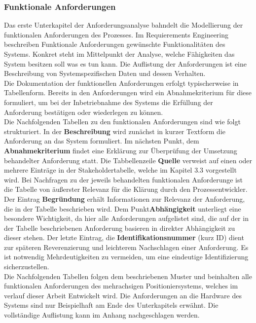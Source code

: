 \documentclass[../Bachelorarbeit.tex]{subfiles}
\begin{document}
\subsubsection{Funktionale Anforderungen}
Das erste Unterkapitel der Anforderungsanalyse bahndelt die Modellierung der funktionalen Anforderungen des Prozesses. Im Requierements Engineering beschreiben Funktionale Anforderungen gewünschte Funktionalitäten des Systems. Konkret steht im Mittelpunkt der Analyse, welche Fähigkeiten das System besitzen soll \bzw was es tun kann. Die Auflistung der Anforderungen ist eine Beschreibung von Systemspezifischen Daten und dessen Verhalten.\\ %
Die Dokumentation der funktionellen Anforderungen erfolgt typischerweise in Tabellenform. Bereits in den Anforderungen wird ein Abnahmekriterium für diese formuliert, um bei der Inbetriebnahme des Systems die Erfüllung der Anforderung bestätigen oder wiederlegen zu können.\\ %
Die Nachfolgenden Tabellen zu den funktionalen Anforderungen sind wie folgt strukturiert. In der \textbf{Beschreibung} wird zunächst in kurzer Textform die Anforderung an das System formuliert. Im nächsten Punkt, dem \textbf{Abnahmekriterium} findet eine Erklärung zur Überprüfung der Umsetzung behandelter Anforderung statt. Die Tabbellenzeile \textbf{Quelle} verweist auf einen oder mehrere Einträge in der Stakeholdertabelle, welche im Kapitel 3.3 vorgestellt wird. %
Bei Nachfragen zu der jeweils behandelten funktionalen Anforderunge ist die Tabelle von äußerster Relevanz für die Klärung durch den Prozessentwickler. Der Eintrag \textbf{Begründung} erhält Informationen zur Relevanz der Anforderung, die in der Tabelle beschrieben wird. Dem Punkt\textbf{Abhängigkeit} unterliegt eine besondere Wichtigkeit, da hier alle Anforderungen aufgelistet sind, die auf der in der Tabelle beschriebenen Anforderung basieren \bzw in direkter Abhängigkeit zu dieser stehen. Der letzte Eintrag, die \textbf{Identifikationsnummer} (kurz ID) dient zur späteren Reverenzierung und leichterem Nachschlagen einer Anforderung. Es ist notwendig Mehrdeutigkeiten zu vermeiden, um eine eindeutige Identifizierung sicherzustellen.\\ %
Die Nachfolgenden Tabellen folgen dem beschriebenen Muster und beinhalten alle funktionalen Anforderungen des mehrachsigen Positioniersystems, welches im verlauf dieser Arbeit Entwickelt wird. Die Anforderungen an die Hardware des Systems sind nur Beispielhaft am Ende des Unterkapitels erwähnt. Die vollständige Auflistung kann im Anhang nachgeschlagen werden.
\end{document}
